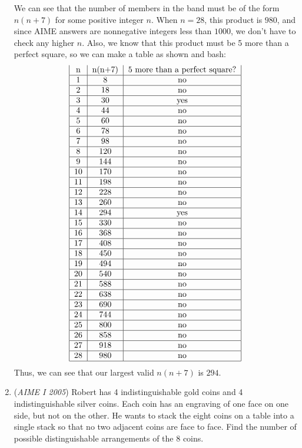 \begin{enumerate}
 We can see that the number of members in the band must be of the form $n(n + 7)$ for some positive integer $n$. When $n = 28$, this product is $980$, and since AIME answers are nonnegative integers less than $1000$, we don't have to check any higher $n$. Also, we know that this product must be 5 more than a perfect square, so we can make a table as shown and bash:
 \[\begin{tabular}{|c|c|c|} n & n(n+7) & 5 more than a perfect square?\\ \hline 1 & 8 & no\\ \hline 2 & 18 & no\\ \hline 3 & 30 & yes\\ \hline 4 & 44 & no\\ \hline 5 & 60 & no\\ \hline 6 & 78 & no\\ \hline 7 & 98 & no\\ \hline 8 & 120 & no\\ \hline 9 & 144 & no\\ \hline 10 & 170 & no\\ \hline 11 & 198 & no\\ \hline 12 & 228 & no\\ \hline 13 & 260 & no\\ \hline 14 & 294 & yes\\ \hline 15 & 330 & no\\ \hline 16 & 368 & no\\ \hline 17 & 408 & no\\ \hline 18 & 450 & no\\ \hline 19 & 494 & no\\ \hline 20 & 540 & no\\ \hline 21 & 588 & no\\ \hline 22 & 638 & no\\ \hline 23 & 690 & no\\ \hline 24 & 744 & no\\ \hline 25 & 800 & no\\ \hline 26 & 858 & no\\ \hline 27 & 918 & no\\ \hline 28 & 980 & no\\ \hline \end{tabular}\]Thus, we can see that our largest valid $n(n+7)$ is $\boxed{294}$.

 


	\item (\textit{AIME I 2005}) Robert has 4 indistinguishable gold coins and 4 indistinguishable silver coins. Each coin has an engraving of one face on one side, but not on the other. He wants to stack the eight coins on a table into a single stack so that no two adjacent coins are face to face. Find the number of possible distinguishable arrangements of the 8 coins.



\end{enumerate}
